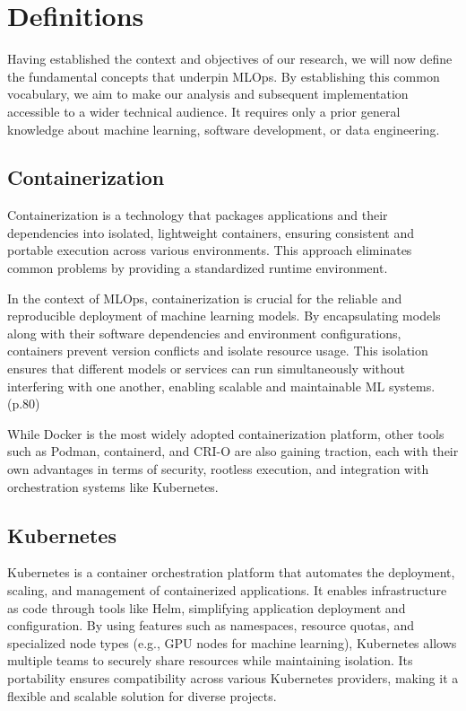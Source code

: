 \section{Definitions}\label{sec:definitions}

Having established the context and objectives of our research, we will now define the fundamental concepts that underpin MLOps.
By establishing this common vocabulary, we aim to make our analysis and subsequent implementation accessible to a wider technical audience.
It requires only a prior general knowledge about machine learning, software development, or data engineering.

\subsection{Containerization}\label{subsec:containerization}

Containerization is a technology that packages applications and their dependencies into isolated, lightweight containers,
ensuring consistent and portable execution across various environments.
This approach eliminates common problems by providing a standardized runtime environment\cite{docker}.

In the context of MLOps, containerization is crucial for the reliable and reproducible deployment of machine learning models.
By encapsulating models along with their software dependencies and environment configurations, containers prevent version conflicts and isolate resource usage.
This isolation ensures that different models or services can run simultaneously without interfering with one another,
enabling scalable and maintainable ML systems.\cite{treveil2020introducing}(p.80)

While Docker\cite{docker} is the most widely adopted containerization platform, other tools such as Podman, containerd,
and CRI-O are also gaining traction, each with their own advantages in terms of security, rootless execution,
and integration with orchestration systems like Kubernetes.


\subsection{Kubernetes}\label{subsec:kubernetes2}

Kubernetes\cite{kubernetes} is a container orchestration platform that automates the deployment, scaling, and management of containerized applications.
It enables infrastructure as code through tools like Helm, simplifying application deployment and configuration.
By using features such as namespaces, resource quotas, and specialized node types (e.g., GPU nodes for machine learning),
Kubernetes allows multiple teams to securely share resources while maintaining isolation.
Its portability ensures compatibility across various Kubernetes providers, making it a flexible and scalable solution for diverse projects.

